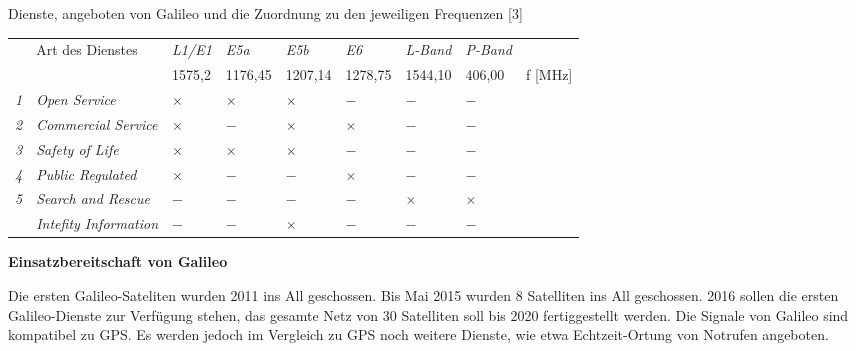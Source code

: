 \documentclass[letterpaper,11pt,ngerman]{andi}
\begin{document}
\begin{threeparttable}
\capstart\caption{Dienste, angeboten von Galileo und die Zuordnung zu den jeweiligen Frequenzen [3]} \label{tablelang}

\begin{tabular}{rllllllll}
   \hline
   &Art des Dienstes & \textit{L1/E1} & \textit{E5a} & \textit{E5b} & \textit{E6} & \textit{L-Band} & \textit{P-Band} \\
   &&1575,2&1176,45&1207,14&1278,75&1544,10&406,00&f [MHz] \\ \hline
   \textit{1}&\textit{Open Service}&\(\times\)&\(\times\)&\(\times\)&\(-\)&\(-\)&\(-\) \\
   \textit{2}&\textit{Commercial Service}&\(\times\)&\(-\)&\(\times\)&\(\times\)& \(-\) & \(-\) \\
   \textit{3}&\textit{Safety of Life}&\(\times\)&\(\times\)&\(\times\)&\(-\)& \(-\) & \(-\) \\
   \textit{4}&\textit{Public Regulated}&\(\times\)&\(-\)&\(-\)&\(\times\)& \(-\) & \(-\) \\
   \textit{5}&\textit{Search and Rescue}&\(-\)&\(-\)&\(-\)&\(-\)& \(\times\)  & \(\times\) \\
   &\textit{Intefity Information}&\(-\)&\(-\)&\(\times\)&\(-\)& \(-\) & \(-\) \\
   \hline
\end{tabular}

\end{threeparttable}

\vspace{0.5cm}
\textbf{Einsatzbereitschaft von Galileo}

Die ersten Galileo-Sateliten wurden 2011 ins All geschossen. Bis Mai 2015 wurden 8 Satelliten ins All geschossen. 2016 sollen die ersten Galileo-Dienste zur Verfügung stehen, das gesamte Netz von 30 Satelliten soll bis 2020 fertiggestellt werden. Die Signale von Galileo sind kompatibel zu GPS. Es werden jedoch im Vergleich zu GPS noch weitere Dienste, wie etwa Echtzeit-Ortung von Notrufen angeboten. \cite{europe_galileo}
\end{document}
